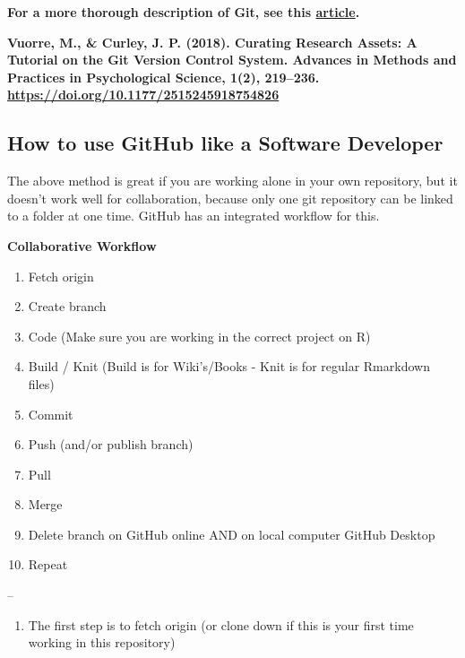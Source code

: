 \documentclass[]{book}
\providecommand{\tightlist}{%
  \setlength{\itemsep}{0pt}\setlength{\parskip}{0pt}}
\begin{document}
\textbf{For a more thorough description of Git, see this \href{https://vuorre.netlify.app/publication/2018/06/01/curating-research-assets-a-tutorial-on-the-git-version-control-system/vuorre-curating-research-assets-2018.pdf}{article}.}

\textbf{Vuorre, M., \& Curley, J. P. (2018). Curating Research Assets: A Tutorial on the Git Version Control System. Advances in Methods and Practices in Psychological Science, 1(2), 219--236. \url{https://doi.org/10.1177/2515245918754826}}

\hypertarget{how-to-use-github-like-a-software-developer}{%
\subsection{How to use GitHub like a Software Developer}\label{how-to-use-github-like-a-software-developer}}

The above method is great if you are working alone in your own repository, but it doesn't work well for collaboration, because only one git repository can be linked to a folder at one time. GitHub has an integrated workflow for this.

\textbf{Collaborative Workflow}

\begin{enumerate}
\def\labelenumi{\arabic{enumi}.}
\tightlist
\item
  Fetch origin
\item
  Create branch
\item
  Code (Make sure you are working in the correct project on R)
\item
  Build / Knit (Build is for Wiki's/Books - Knit is for regular Rmarkdown files)
\item
  Commit
\item
  Push (and/or publish branch)
\item
  Pull
\item
  Merge
\item
  Delete branch on GitHub online AND on local computer GitHub Desktop
\item
  Repeat
\end{enumerate}

--

\begin{enumerate}
\def\labelenumi{\arabic{enumi}.}
\tightlist
\item
  The first step is to fetch origin (or clone down if this is your first time working in this repository)
\end{enumerate}
\end{document}
